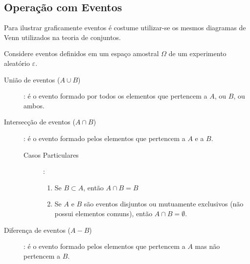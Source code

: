 \subsection{Operação com Eventos}
Para ilustrar graficamente eventos é costume utilizar-se os mesmos diagramas de Venn utilizados na teoria de conjuntos.

Considere eventos definidos em um espaço amostral $\Omega$ de um experimento aleatório $\varepsilon$.

\begin{description}
  \item [União de eventos ($A \cup B$)]: é o evento formado por todos os elementos que pertencem a $A$, ou  $B$, ou ambos.
    \begin{figure}[H]
      \centering
      
      \caption{}
      \label{fig:1}
    \end{figure} 
  \item [Intersecção de eventos ($A \cap B$)]: é o evento formado pelos elementos que pertencem a $A$ e a $B$.
    \begin{figure}[H]
      \centering
      
      \caption{}
      \label{fig:2}
    \end{figure} 
    \begin{description}
      \item[Casos Particulares]:
        \begin{enumerate}
          \item Se $B \subset A$, então $A \cap B= B$ 

            \begin{figure}[H]
              \centering
              
              \caption{}
              \label{fig:3}
            \end{figure}

          \item Se $A$ e $B$ são eventos disjuntos ou mutuamente exclusivos (não possui elementos comuns), então $A\cap B = \emptyset$.

            \begin{figure}[H]
              \centering
              
              \caption{}
              \label{fig:4}
            \end{figure}

        \end{enumerate}
    \end{description}
  \item[Diferença de eventos ($A-B$)]: é o evento formado pelos elementos que pertencem a $A$ mas não pertencem a $B$.


\end{description}
